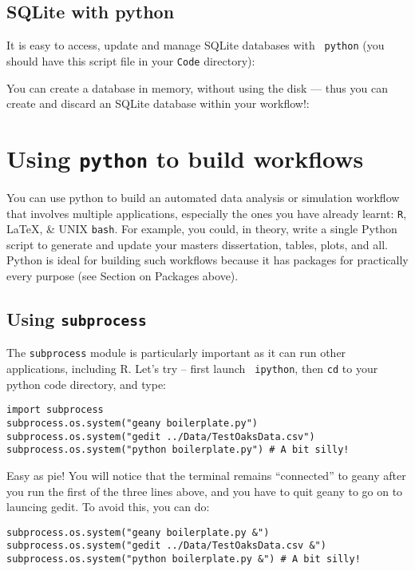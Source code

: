 \subsection{SQLite with python}   
It is easy to access, update and manage SQLite databases with {\tt 
python} (you should have this script file in your {\tt Code} 
directory):
 

 
You can create a database in memory, without using the disk --- thus 
you can create and discard an SQLite database within your workflow!:



\section{Using {\tt python} to build workflows}

You can use python to build an automated data analysis or simulation 
workflow that involves multiple applications, especially the ones you 
have already learnt: {\tt R}, \LaTeX, \& UNIX {\tt bash}. For example, 
you could, in theory, write a single Python script to generate and 
update your masters dissertation, tables, plots, and all. Python is 
ideal for building such workflows because it has packages for 
practically every purpose (see Section on Packages above).

\subsection{Using {\tt subprocess}}

The {\tt subprocess} module is particularly important as it can run 
other applications, including R. Let's try -- first launch {\tt 
ipython}, then {\tt cd} to your python code directory, and type:
\begin{lstlisting}
import subprocess
subprocess.os.system("geany boilerplate.py")
subprocess.os.system("gedit ../Data/TestOaksData.csv")
subprocess.os.system("python boilerplate.py") # A bit silly! 
\end{lstlisting}
  
Easy as pie! You will notice that the terminal remains ``connected'' to 
geany after you run the first of the three lines above, and you have 
to quit geany to go on to launcing gedit. To avoid this, you can do:    

\begin{lstlisting}
subprocess.os.system("geany boilerplate.py &")
subprocess.os.system("gedit ../Data/TestOaksData.csv &")
subprocess.os.system("python boilerplate.py &") # A bit silly! 
\end{lstlisting}

